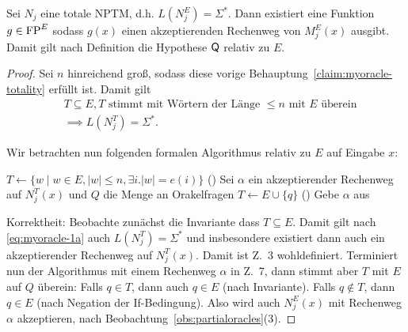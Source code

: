 \begin{claim}\label{claim:myoracle-q}
    Sei $N_j$ eine totale NPTM, d.h. $L(N_j^E)=\Sigma^*$. Dann existiert eine Funktion $g\in \mathrm{FP}^E$ sodass $g(x)$ einen akzeptierenden Rechenweg von $M^E_j(x)$ ausgibt. Damit gilt nach Definition die Hypothese $\mathsf{Q}$ relativ zu $E$.
\end{claim}
\begin{proof}
    Sei $n$ hinreichend groß, sodass diese vorige Behauptung~\ref{claim:myoracle-totality} erfüllt ist.
    Damit gilt
    \begin{equation} \begin{split}&T\subseteq E, \text{$T$ stimmt mit Wörtern der Länge $\leq n$ mit $E$ überein} \\ &\implies L(N_j^{T})=\Sigma^*.\end{split}\label{eq:myoracle-1a} \end{equation}

    Wir betrachten nun folgenden formalen Algorithmus relativ zu $E$ auf Eingabe $x$:\\
    \begin{algorithm}[H]
        $T\gets \{ w\mid w\in E, |w|\leq n, \exists i.|w|=e(i)\}$ 
        \Loop(){}
        {
            Sei $\alpha$ ein akzeptierender Rechenweg auf $N_j^{T}(x)$ und $Q$ die Menge an Orakelfragen\;
            {
                $T\gets E \cup \{q\}$\;
            }
            \Else(){
                Gebe {$\alpha$} aus\;
            }
        }
    \end{algorithm}

    Korrektheit: Beobachte zunächst die Invariante dass $T\subseteq E$.
    Damit gilt nach \eqref{eq:myoracle-1a} auch $L(N_j^{T})=\Sigma^*$ und insbesondere existiert dann auch ein akzeptierender Rechenweg auf $N_j^{T}(x)$. Damit ist Z.~3 wohldefiniert.
    Terminiert nun der Algorithmus mit einem Rechenweg $\alpha$ in Z.~7, 
    dann stimmt aber $T$ mit $E$ auf $Q$ überein: 
    Falls $q\in T$, dann auch $q\in E$ (nach Invariante).
    Falls $q\not\in T$, dann $q\in E$ (nach Negation der If-Bedingung).
    Also wird auch $N_j^E(x)$ mit Rechenweg $\alpha$ akzeptieren, nach Beobachtung~\ref{obs:partialoracles}(3).


\end{proof}
